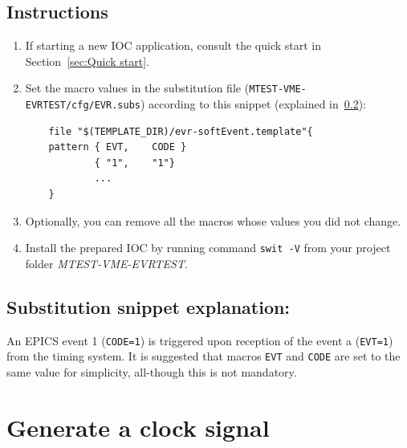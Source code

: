 \documentclass[12pt,a4paper]{article}
\begin{document}
\subsection{Instructions}
\begin{enumerate}
	\item If starting a new IOC application, consult the quick start in Section~\ref{sec:Quick start}.
	
	\item Set the macro values in the substitution file (\texttt{MTEST-VME-EVRTEST/cfg/EVR.subs}) according to this snippet (explained in~\ref{sec:explain_event}):
\begin{verbatim}
	file "$(TEMPLATE_DIR)/evr-softEvent.template"{
	pattern { EVT,    CODE }
	        { "1",    "1"}
	        ...
	}
\end{verbatim}
	\item Optionally, you can remove all the macros whose values you did not change. 

	\item Install the prepared IOC by running command \texttt{swit -V} from your project folder \textit{MTEST-VME-EVRTEST}.
\end{enumerate}

\subsection{Substitution snippet explanation:}\label{sec:explain_event}
An EPICS event 1 (\texttt{CODE=1}) is triggered upon reception of the event a (\texttt{EVT=1}) from the timing system.
It is suggested that macros \texttt{EVT} and \texttt{CODE} are set to the same value for simplicity, all-though this is not mandatory.


\section{Generate a clock signal}
\end{document}
